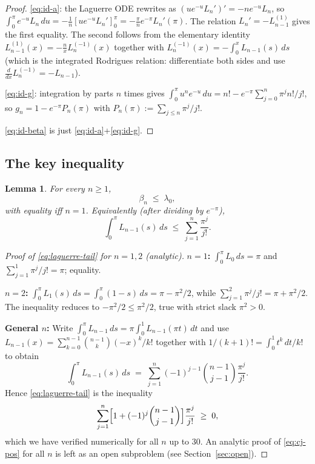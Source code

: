 \documentclass[11pt]{article}
\newtheorem{lemma}[theorem]{Lemma}
\theoremstyle{definition}
\begin{document}
\begin{proof}
\eqref{eq:id-a}: the Laguerre ODE rewrites as $(u e^{-u}L_{n}')'=-n e^{-u}L_{n}$,
so $\int_{0}^{\pi}e^{-u}L_{n}\,du = -\frac{1}{n}[u e^{-u}L_{n}']_{0}^{\pi}
= -\frac{\pi}{n}e^{-\pi}L_{n}'(\pi)$.  The relation $L_{n}'=-L_{n-1}^{(1)}$
gives the first equality.  The second follows from the elementary identity
$L_{n-1}^{(1)}(x)=-\frac{n}{x}L_{n}^{(-1)}(x)$ together with
$L_{n}^{(-1)}(x)=-\int_{0}^{x}L_{n-1}(s)\,ds$ (which is the integrated
Rodrigues relation: differentiate both sides and use $\frac{d}{dx}L_{n}^{(-1)}=-L_{n-1}$).

\eqref{eq:id-g}: integration by parts $n$ times gives
$\int_{0}^{\pi}u^{n}e^{-u}\,du = n!-e^{-\pi}\sum_{j=0}^{n}\pi^{j}n!/j!$,
so $g_{n}=1-e^{-\pi}P_{n}(\pi)$ with $P_{n}(\pi):=\sum_{j\le n}\pi^{j}/j!$.

\eqref{eq:id-beta} is just \eqref{eq:id-a}+\eqref{eq:id-g}.
\end{proof}

\subsection{The key inequality}

\begin{lemma}\label{lem:beta-bound}
For every $n\ge 1$,
\[
   \beta_{n}\;\le\;\lambda_{0},
\]
with equality iff $n=1$.  Equivalently (after dividing by $e^{-\pi}$),
\begin{equation}\label{eq:laguerre-tail}
   \int_{0}^{\pi} L_{n-1}(s)\,ds \;\le\; \sum_{j=1}^{n}\frac{\pi^{j}}{j!}.
\end{equation}
\end{lemma}

\begin{proof}[Proof of \eqref{eq:laguerre-tail} for $n=1,2$ \textup{(}analytic\textup{)}]
\textbf{$n=1$:} $\int_{0}^{\pi}L_{0}\,ds=\pi$ and $\sum_{j=1}^{1}\pi^{j}/j!=\pi$;
equality.

\textbf{$n=2$:} $\int_{0}^{\pi}L_{1}(s)\,ds=\int_{0}^{\pi}(1-s)\,ds=\pi-\pi^{2}/2$,
while $\sum_{j=1}^{2}\pi^{j}/j!=\pi+\pi^{2}/2$.  The inequality reduces to
$-\pi^{2}/2\le\pi^{2}/2$, true with strict slack $\pi^{2}>0$.

\textbf{General $n$:}  Write $\int_{0}^{\pi}L_{n-1}\,ds = \pi\int_{0}^{1}L_{n-1}(\pi t)\,dt$
and use $L_{n-1}(x)=\sum_{k=0}^{n-1}\binom{n-1}{k}(-x)^{k}/k!$ together with
$1/(k+1)!=\int_{0}^{1}t^{k}\,dt/k!$ to obtain
\[
   \int_{0}^{\pi}L_{n-1}(s)\,ds
   \;=\;\sum_{j=1}^{n}(-1)^{j-1}\binom{n-1}{j-1}\frac{\pi^{j}}{j!}.
\]
Hence \eqref{eq:laguerre-tail} is the inequality
\begin{equation}\label{eq:cj-pos}
  \sum_{j=1}^{n}\Bigl[1+(-1)^{j}\binom{n-1}{j-1}\Bigr]\frac{\pi^{j}}{j!}\;\ge\;0,
\end{equation}
which we have verified numerically for all $n$ up to $30$.  An analytic proof
of \eqref{eq:cj-pos} for all $n$ is left as an open subproblem
\textup{(}see Section~\ref{sec:open}\textup{)}.
\end{proof}
\end{document}
